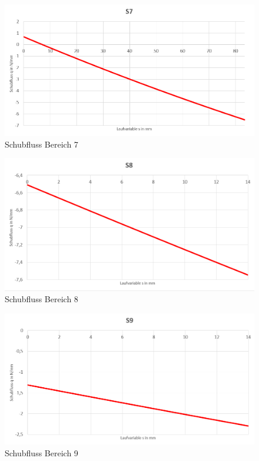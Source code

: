 \begin{figure}[h]
	\includegraphics[width=1.0\textwidth]{Bilder/S7.png}
	\caption{Schubfluss Bereich 7}
\end{figure}
\begin{figure}[h]
	\includegraphics[width=1.0\textwidth]{Bilder/S8.png}
	\caption{Schubfluss Bereich 8}
\end{figure}
\begin{figure}[h]
	\includegraphics[width=1.0\textwidth]{Bilder/S9.png}
	\caption{Schubfluss Bereich 9}
\end{figure}
